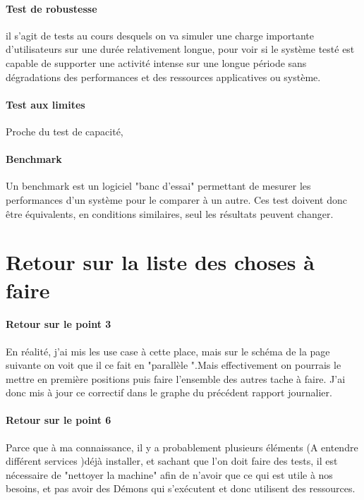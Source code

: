 \documentclass[french]{article}
\begin{document}
\paragraph{Test de robustesse}
 il s'agit de tests au cours desquels on va simuler une charge importante d'utilisateurs sur une durée relativement longue, pour voir si le système testé est capable de supporter une activité intense sur une longue période sans dégradations des performances et des ressources applicatives ou système.
\paragraph{Test aux limites} 
Proche du test de capacité,
\paragraph{Benchmark}
Un benchmark est un logiciel "banc d'essai" permettant de mesurer les performances d'un système pour le comparer à un autre. Ces test doivent donc être équivalents, en conditions similaires, seul les résultats peuvent changer.
\newpage
\section{Retour sur la liste des choses à faire}

\paragraph{Retour sur le point 3}

En réalité, j'ai mis les use case à cette place, mais sur le schéma de la page suivante on voit que il ce fait en "parallèle ".Mais effectivement on pourrais le mettre en première positions puis faire l'ensemble des autres tache à faire.
J'ai donc mis à jour ce correctif dans le graphe du précédent rapport journalier. 
\paragraph{Retour sur le point 6}
Parce que à ma connaissance, il y a probablement plusieurs éléments (A entendre différent services  )déjà installer, et sachant que l'on doit faire des tests, il est nécessaire de "nettoyer la machine" afin de n'avoir que ce qui est utile à nos besoins, et pas avoir des Démons qui s’exécutent et donc utilisent des ressources. 
\end{document}
